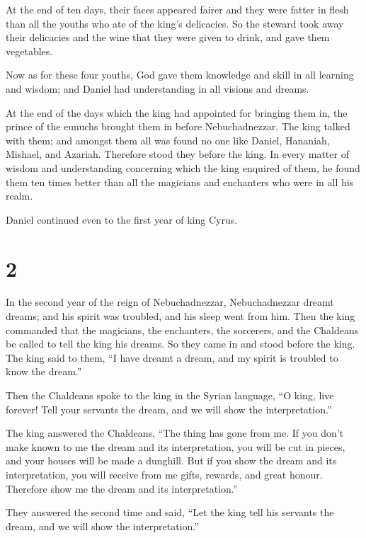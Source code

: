 At the end of ten days, their faces appeared fairer and
they were fatter in flesh than all the youths who ate of the king's
delicacies.  So the steward took away their delicacies
and the wine that they were given to drink, and gave them vegetables.

 Now as for these four youths, God gave them knowledge
and skill in all learning and wisdom; and Daniel had understanding in
all visions and dreams.

 At the end of the days which the king had appointed for
bringing them in, the prince of the eunuchs brought them in before
Nebuchadnezzar.  The king talked with them; and amongst
them all was found no one like Daniel, Hananiah, Mishael, and Azariah.
Therefore stood they before the king.  In every matter of
wisdom and understanding concerning which the king enquired of them, he
found them ten times better than all the magicians and enchanters who
were in all his realm.

 Daniel continued even to the first year of king Cyrus.

\hypertarget{section-1}{%
\section{2}\label{section-1}}

 In the second year of the reign of Nebuchadnezzar,
Nebuchadnezzar dreamt dreams; and his spirit was troubled, and his sleep
went from him.  Then the king commanded that the
magicians, the enchanters, the sorcerers, and the Chaldeans be called to
tell the king his dreams. So they came in and stood before the king.
 The king said to them, ``I have dreamt a dream, and my
spirit is troubled to know the dream.''

 Then the Chaldeans spoke to the king in the Syrian
language, ``O king, live forever! Tell your servants the dream, and we
will show the interpretation.''

 The king answered the Chaldeans, ``The thing has gone
from me. If you don't make known to me the dream and its interpretation,
you will be cut in pieces, and your houses will be made a dunghill.
 But if you show the dream and its interpretation, you
will receive from me gifts, rewards, and great honour. Therefore show me
the dream and its interpretation.''

 They answered the second time and said, ``Let the king
tell his servants the dream, and we will show the interpretation.''

